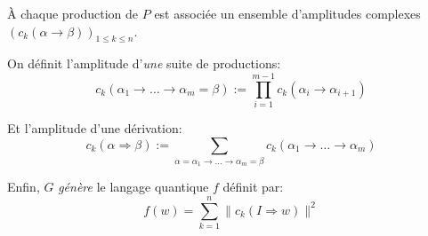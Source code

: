 \documentclass[aspectratio=169]{beamer}
\theoremstyle{plain}
\theoremstyle{definition}
\begin{document}
\begin{frame}
    À chaque production de $P$ est associée un ensemble d'amplitudes complexes $\left(c_k(\alpha\to\beta)\right)_{1\leq k\leq n}$.
    
    On définit l'amplitude d'\emph{une} suite de productions:
    \begin{equation*}
        c_k(\alpha_1 \to \dots \to \alpha_m=\beta) := \prod_{i=1}^{m-1} c_k(\alpha_i\to\alpha_{i+1})
    \end{equation*}

    Et l'amplitude d'une dérivation:
    \begin{equation*}
        c_k(\alpha\Rightarrow\beta) := \sum_{\alpha=\alpha_1 \to \dots \to \alpha_m=\beta} c_k(\alpha_1 \to \dots \to \alpha_m)
    \end{equation*}

    Enfin, $G$ \emph{génère} le langage quantique $f$ définit par:
    \begin{equation*}
        f(w) = \sum_{k=1}^n \|c_k(I\Rightarrow w)\|^2
    \end{equation*}
\end{frame}
\end{document}
